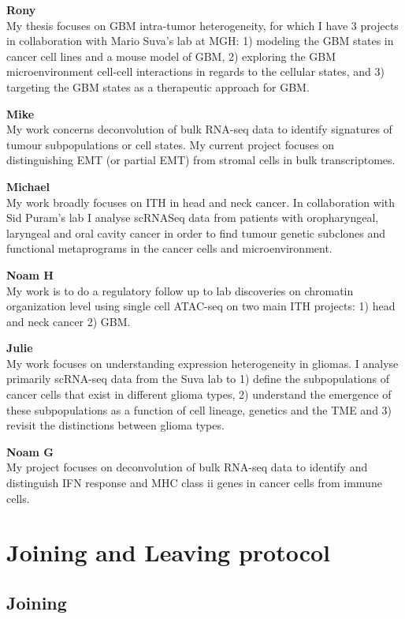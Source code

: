 \documentclass[
]{book}
\begin{document}
\textbf{Rony}\\
My thesis focuses on GBM intra-tumor heterogeneity, for which I have 3 projects in collaboration with Mario Suva's lab at MGH: 1) modeling the GBM states in cancer cell lines and a mouse model of GBM, 2) exploring the GBM microenvironment cell-cell interactions in regards to the cellular states, and 3) targeting the GBM states as a therapeutic approach for GBM.

\textbf{Mike}\\
My work concerns deconvolution of bulk RNA-seq data to identify signatures of tumour subpopulations or cell states. My current project focuses on distinguishing EMT (or partial EMT) from stromal cells in bulk transcriptomes.

\textbf{Michael}\\
My work broadly focuses on ITH in head and neck cancer. In collaboration with Sid Puram's lab I analyse scRNASeq data from patients with oropharyngeal, laryngeal and oral cavity cancer in order to find tumour genetic subclones and functional metaprograms in the cancer cells and microenvironment.

\textbf{Noam H}\\
My work is to do a regulatory follow up to lab discoveries on chromatin organization level using single cell ATAC-seq on two main ITH projects: 1) head and neck cancer 2) GBM.

\textbf{Julie}\\
My work focuses on understanding expression heterogeneity in gliomas. I analyse primarily scRNA-seq data from the Suva lab to 1) define the subpopulations of cancer cells that exist in different glioma types, 2) understand the emergence of these subpopulations as a function of cell lineage, genetics and the TME and 3) revisit the distinctions between glioma types.

\textbf{Noam G}\\
My project focuses on deconvolution of bulk RNA-seq data to identify and distinguish IFN response and MHC class ii genes in cancer cells from immune cells.

\hypertarget{joiningLeaving}{%
\chapter{Joining and Leaving protocol}\label{joiningLeaving}}

\hypertarget{joining}{%
\section{Joining}\label{joining}}
\end{document}
